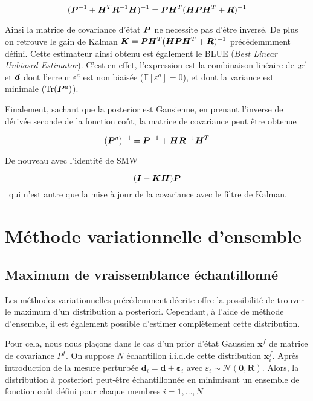 \begin{equation*}
    (\bm{P}^{-1} + \bm{H}^T \bm{R}^{-1} \bm{H})^{-1} = \bm{P} \bm{H}^T (\bm{H} \bm{P} \bm{H}^T + \bm{R})^{-1}
\end{equation*}

Ainsi la matrice de covariance d'état $\bm{P}$ ne necessite pas d'être inversé. De plus on retrouve le gain de Kalman $\bm{K} = \bm{P} \bm{H}^T (\bm{H} \bm{P} \bm{H}^T + \bm{R})^{-1}$ précédemmment défini. Cette estimateur ainsi obtenu est également le BLUE (\textit{Best Linear Unbiased Estimator}). C'est en effet, l'expression est la combinaison linéaire de $\bm{x}^f$ et $\bm{d}$ dont l'erreur $\varepsilon^a$ est non biaisée ($\mathbb{E}[\varepsilon^a] = 0$), et dont la variance est minimale ($\operatorname{Tr}(\bm{P}^a)$).

Finalement, sachant que la posterior est Gausienne, en prenant l'inverse de dérivée seconde de la fonction coût, la matrice de covariance peut être obtenue

\begin{equation*}
    (\bm{P}^a)^{-1} = \bm{P}^{-1} + \bm{H} \bm{R}^{-1} \bm{H}^T
\end{equation*}

De nouveau avec l'identité de SMW

\begin{equation*}
    (\bm{I} - \bm{K} \bm{H}) \bm{P}
\end{equation*}~qui n'est autre que la mise à jour de la covariance avec le filtre de Kalman.

\section{Méthode variationnelle d'ensemble}

\subsection{Maximum de vraissemblance échantillonné}
Les méthodes variationnelles précédemment décrite offre la possibilité de trouver le maximum d'un distribution a posteriori. Cependant, à l'aide de méthode d'ensemble, il est également possible d'estimer complètement cette distribution.

Pour cela, nous nous plaçons dans le cas d'un prior d'état Gaussien $\bm x^f$ de matrice de covariance $P^f$. On suppose $N$ échantillon i.i.d.de cette distribution $\bm x^f_i$. Après introduction de la mesure perturbée $\bm d_i = \bm d + \bm \varepsilon_i$ avec $\varepsilon_i \sim \mathcal{N}(\bm 0, \bm R)$. Alors, la distribution à posteriori peut-être échantillonnée en minimisant un ensemble de fonction coût défini pour chaque membres $i = 1, \dots, N$

